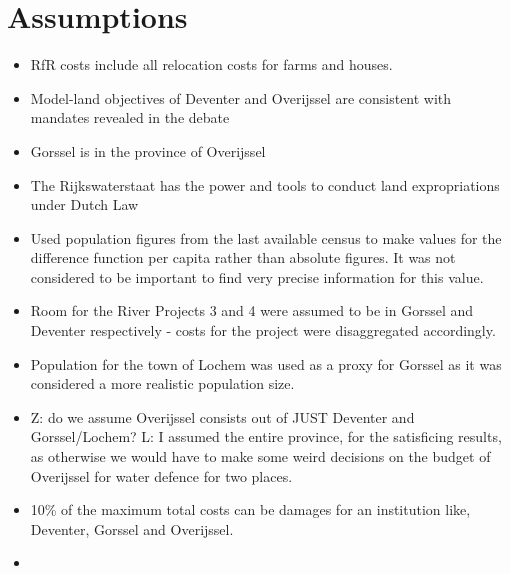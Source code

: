 
\section{Assumptions}
\begin{itemize}
    \item RfR costs include all relocation costs for farms and houses.
    \item Model-land objectives of Deventer and Overijssel are consistent with mandates revealed in the debate
    \item Gorssel is in the province of Overijssel
    \item The Rijkswaterstaat has the power and tools to conduct land expropriations under Dutch Law
    \item Used population figures from the last available census to make values for the difference function per capita rather than absolute figures. It was not considered to be important to find very precise information for this value.
    \item Room for the River Projects 3 and 4 were assumed to be in Gorssel and Deventer respectively - costs for the project were disaggregated accordingly.
    \item Population for the town of Lochem was used as a proxy for Gorssel as it was considered a more realistic population size.
    \item Z: do we assume Overijssel consists out of JUST Deventer and Gorssel/Lochem? L: I assumed the entire province, for the satisficing results, as otherwise we would have to make some weird decisions on the budget of Overijssel for water defence for two places.
    \item 10\% of the maximum total costs can be damages for an institution like, Deventer, Gorssel and Overijssel.
    \item 
    
\end{itemize}






